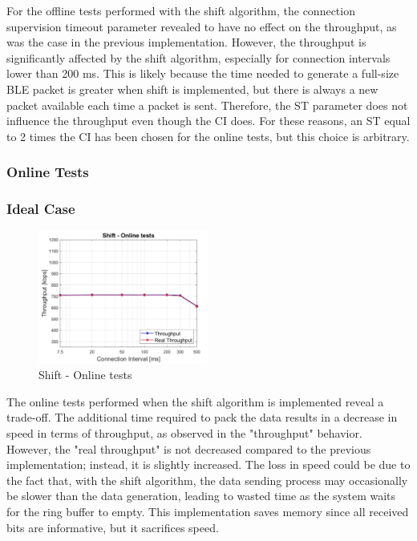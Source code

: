\documentclass{Configuration_Files/PoliMi3i_thesis}
\begin{document}
For the offline tests performed with the shift algorithm, the connection supervision timeout parameter revealed to have no effect on the throughput, as was the case in the previous implementation. However, the throughput is significantly affected by the shift algorithm, especially for connection intervals lower than 200 ms. This is likely because the time needed to generate a full-size BLE packet is greater when shift is implemented, but there is always a new packet available each time a packet is sent. Therefore, the ST parameter does not influence the throughput even though the CI does. For these reasons, an ST equal to 2 times the CI has been chosen for the online tests, but this choice is arbitrary.

\subsubsection*{Online Tests}
\subsubsection*{Ideal Case}

\begin{figure}[H]
    \centering
    \includegraphics[width=0.5\textwidth]{Results Manuel/figure15}
    \caption{Shift - Online tests}
    \label{manuel_results_15}
\end{figure}

The online tests performed when the shift algorithm is implemented reveal a trade-off. The additional time required to pack the data results in a decrease in speed in terms of throughput, as observed in the "throughput" behavior. However, the "real throughput" is not decreased compared to the previous implementation; instead, it is slightly increased. The loss in speed could be due to the fact that, with the shift algorithm, the data sending process may occasionally be slower than the data generation, leading to wasted time as the system waits for the ring buffer to empty. This implementation saves memory since all received bits are informative, but it sacrifices speed.
\end{document}
